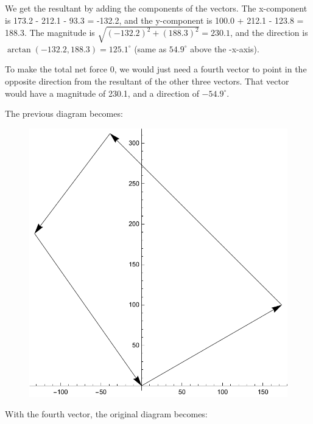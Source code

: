 \documentclass{amsart}
\begin{document}
We get the resultant by adding the components of the vectors.
The x-component is 173.2 - 212.1 - 93.3 = -132.2, and the y-component is 100.0 + 212.1 - 123.8 = 188.3.
The magnitude is $\sqrt{(-132.2)^{2} + (188.3)^2} = 230.1$,
and the direction is $\arctan (-132.2, 188.3) = 125.1^\circ$ (same as $54.9^\circ$ above the -x-axis).

To make the total net force 0, we would just need a fourth vector to point in the opposite direction
from the resultant of the other three vectors.  That vector would have a magnitude of 230.1,
and a direction of $-54.9^\circ$.

\clearpage
The previous diagram becomes:

\begin{figure}[h]
\includegraphics[scale=0.4]{2-4c}
\end{figure}

With the fourth vector, the original diagram becomes:
\end{document}
